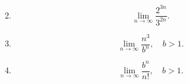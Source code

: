 \documentclass[12pt]{article}
\begin{document}
\begin{enumerate}
\begin{multicols}{2}
\begin{enumerate}
\begin{equation*}
                    \end{equation*}
                \item \begin{equation*}
                        \lim_{n\rightarrow\infty}\frac{2^{3n}}{3^{2n}}.
                    \end{equation*}
                \item \begin{equation*}
                        \lim_{n\rightarrow\infty}\frac{n^3}{b^n}, \quad b>1.
                    \end{equation*}
                \item \begin{equation*}
                        \lim_{n\rightarrow\infty}\frac{b^n}{n!}, \quad b>1.
                    \end{equation*}
            \end{enumerate}
        \end{multicols}
        

\end{enumerate}
\end{document}
